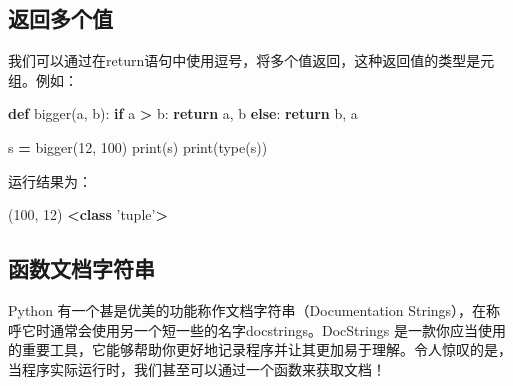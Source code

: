 \documentclass[]{ctexbook}
\newenvironment{Shaded}{\begin{snugshade}}{\end{snugshade}}
\newcommand{\BuiltInTok}[1]{#1}
\newcommand{\ControlFlowTok}[1]{\textcolor[rgb]{0.13,0.29,0.53}{\textbf{#1}}}
\newcommand{\DecValTok}[1]{\textcolor[rgb]{0.00,0.00,0.81}{#1}}
\newcommand{\KeywordTok}[1]{\textcolor[rgb]{0.13,0.29,0.53}{\textbf{#1}}}
\newcommand{\NormalTok}[1]{#1}
\newcommand{\OperatorTok}[1]{\textcolor[rgb]{0.81,0.36,0.00}{\textbf{#1}}}
\newcommand{\StringTok}[1]{\textcolor[rgb]{0.31,0.60,0.02}{#1}}
\begin{document}
\hypertarget{ux8fd4ux56deux591aux4e2aux503c}{%
\subsection{返回多个值}\label{ux8fd4ux56deux591aux4e2aux503c}}

我们可以通过在return语句中使用逗号，将多个值返回，这种返回值的类型是元组。例如：

\begin{Shaded}
\begin{Highlighting}[]
\KeywordTok{def}\NormalTok{ bigger(a, b):}
    \ControlFlowTok{if}\NormalTok{ a }\OperatorTok{>}\NormalTok{ b:}
        \ControlFlowTok{return}\NormalTok{ a, b}
    \ControlFlowTok{else}\NormalTok{:}
        \ControlFlowTok{return}\NormalTok{ b, a}

\NormalTok{s }\OperatorTok{=}\NormalTok{ bigger(}\DecValTok{12}\NormalTok{, }\DecValTok{100}\NormalTok{)}
\BuiltInTok{print}\NormalTok{(s)}
\BuiltInTok{print}\NormalTok{(}\BuiltInTok{type}\NormalTok{(s))}
\end{Highlighting}
\end{Shaded}

运行结果为：

\begin{Shaded}
\begin{Highlighting}[]
\NormalTok{(}\DecValTok{100}\NormalTok{, }\DecValTok{12}\NormalTok{)}
\OperatorTok{<}\KeywordTok{class} \StringTok{'tuple'}\OperatorTok{>}
\end{Highlighting}
\end{Shaded}

\hypertarget{ux51fdux6570ux6587ux6863ux5b57ux7b26ux4e32}{%
\subsection{函数文档字符串}\label{ux51fdux6570ux6587ux6863ux5b57ux7b26ux4e32}}

Python 有一个甚是优美的功能称作文档字符串（Documentation Strings），在称呼它时通常会使用另一个短一些的名字docstrings。DocStrings 是一款你应当使用的重要工具，它能够帮助你更好地记录程序并让其更加易于理解。令人惊叹的是，当程序实际运行时，我们甚至可以通过一个函数来获取文档！
\end{document}
